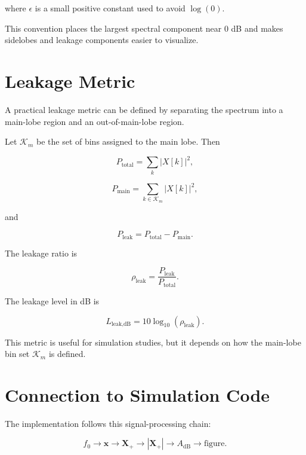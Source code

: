 ﻿\documentclass[11pt]{article}
\begin{document}
where $\epsilon$ is a small positive constant used to avoid $\log(0)$.

This convention places the largest spectral component near 0 dB and makes sidelobes and leakage components easier to visualize.

\section{Leakage Metric}

A practical leakage metric can be defined by separating the spectrum into a main-lobe region and an out-of-main-lobe region.

Let $\mathcal{K}_{m}$ be the set of bins assigned to the main lobe. Then

\begin{equation}
P_{\text{total}}
=
\sum_{k} |X[k]|^2,
\end{equation}

\begin{equation}
P_{\text{main}}
=
\sum_{k \in \mathcal{K}_{m}} |X[k]|^2,
\end{equation}

and

\begin{equation}
P_{\text{leak}}
=
P_{\text{total}} - P_{\text{main}}.
\end{equation}

The leakage ratio is

\begin{equation}
\rho_{\text{leak}}
=
\frac{P_{\text{leak}}}{P_{\text{total}}}.
\end{equation}

The leakage level in dB is

\begin{equation}
L_{\text{leak,dB}}
=
10\log_{10}\left(\rho_{\text{leak}}\right).
\end{equation}

This metric is useful for simulation studies, but it depends on how the main-lobe bin set $\mathcal{K}_{m}$ is defined.

\section{Connection to Simulation Code}

The implementation follows this signal-processing chain:

\begin{equation}
f_0
\rightarrow
\bm{x}
\rightarrow
\bm{X}_{+}
\rightarrow
|\bm{X}_{+}|
\rightarrow
A_{\text{dB}}
\rightarrow
\text{figure}.
\end{equation}
\end{document}
